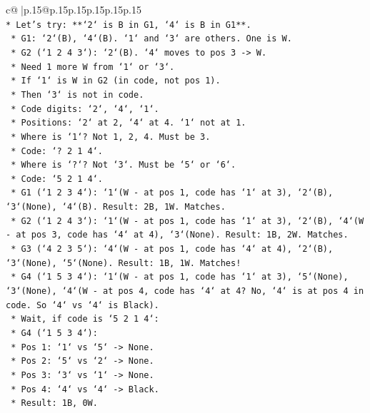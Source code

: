 \documentclass{article}
\begin{document}
{\begin{supertabular}{c@{$\;$}|p{.15\linewidth}@{}p{.15\linewidth}p{.15\linewidth}p{.15\linewidth}p{.15\linewidth}p{.15\linewidth}}
{{{\\ 
\texttt{*   Let's try: **`2` is B in G1, `4` is B in G1**.} \\
\texttt{    *   G1: `2`(B), `4`(B). `1` and `3` are others. One is W.} \\
\texttt{    *   G2 (`1 2 4 3`): `2`(B). `4` moves to pos 3 {-}> W.} \\
\texttt{    *   Need 1 more W from `1` or `3`.} \\
\texttt{    *   If `1` is W in G2 (in code, not pos 1).} \\
\texttt{    *   Then `3` is not in code.} \\
\texttt{    *   Code digits: `2`, `4`, `1`.} \\
\texttt{    *   Positions: `2` at 2, `4` at 4. `1` not at 1.} \\
\texttt{    *   Where is `1`? Not 1, 2, 4. Must be 3.} \\
\texttt{    *   Code: `? 2 1 4`.} \\
\texttt{    *   Where is `?`? Not `3`. Must be `5` or `6`.} \\
\texttt{    *   Code: `5 2 1 4`.} \\
\texttt{        *   G1 (`1 2 3 4`): `1`(W {-} at pos 1, code has `1` at 3), `2`(B), `3`(None), `4`(B). Result: 2B, 1W. Matches.} \\
\texttt{        *   G2 (`1 2 4 3`): `1`(W {-} at pos 1, code has `1` at 3), `2`(B), `4`(W {-} at pos 3, code has `4` at 4), `3`(None). Result: 1B, 2W. Matches.} \\
\texttt{        *   G3 (`4 2 3 5`): `4`(W {-} at pos 1, code has `4` at 4), `2`(B), `3`(None), `5`(None). Result: 1B, 1W. Matches!} \\
\texttt{        *   G4 (`1 5 3 4`): `1`(W {-} at pos 1, code has `1` at 3), `5`(None), `3`(None), `4`(W {-} at pos 4, code has `4` at 4? No, `4` is at pos 4 in code. So `4` vs `4` is Black).} \\
\texttt{        *   Wait, if code is `5 2 1 4`:} \\
\texttt{            *   G4 (`1 5 3 4`):} \\
\texttt{                *   Pos 1: `1` vs `5` {-}> None.} \\
\texttt{                *   Pos 2: `5` vs `2` {-}> None.} \\
\texttt{                *   Pos 3: `3` vs `1` {-}> None.} \\
\texttt{                *   Pos 4: `4` vs `4` {-}> Black.} \\
\texttt{                *   Result: 1B, 0W.} \\
}}}
\end{supertabular}}
\end{document}

